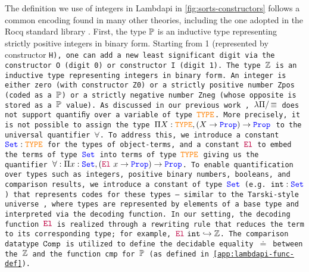 The definition we use of integers in Lambdapi in \cref{fig:sorts-constructors} follows a common encoding found in many other theories, including the one adopted in the Rocq standard library \cite{Rocq-refman}.
First, the type $\bb{P}$  is an inductive type representing strictly positive integers in binary form.
Starting from 1 (represented by constructor \tt{H}), one can add a new least significant digit via the constructor \tt{O} (digit 0) or constructor \tt{I} (digit 1). 
The type $\bb{Z}$ is an inductive type representing integers in binary form.
An integer is either zero (with constructor \tt{Z0}) or a strictly positive number \tt{Zpos} (coded as a $\bb{P}$) or a strictly negative number \tt{Zneg} (whose opposite is stored as a $\bb{P}$ value).
%
As discussed in our previous work \cite{ColtellacciMD24}, $\lpm$ does not support quantiﬁy over a variable of type $\type$. More precisely, it is not possible to assign the type $\Pi X : \type,(X \ra \prop) \ra \prop$ to the universal quantifier $\forall$.
To address this, we introduce a constant $\set : \type$ for the types of object-terms, and a constant ${\el}$ to embed the terms of type $\set$ into terms of type $\type$ giving us the quantifier $\forall: \Pi x: \set, (\el~x \ra \prop) \ra \prop$.
To enable quantification over types such as integers, positive binary numbers, booleans, and comparison results, we introduce a constant of type $\set$ (e.g. $\tt{int}: \set$) that represents codes for these types — similar to the Tarski-style universe \cite[\S Universes]{intuitype},
where types are represented by elements of a base type and interpreted via the decoding function. In our setting, the decoding function $\el$  is realized through a rewriting rule that reduces the term to its corresponding type; for example, $\el~\tt{int} \re \bb{Z}$.
The comparison datatype $\tt{Comp}$ is utilized to define the decidable equality $\doteq$ between the $\bb{Z}$ and the function \tt{cmp} for $\bb{P}$ (as defined in \cref{app:lambdapi-func-def}).


